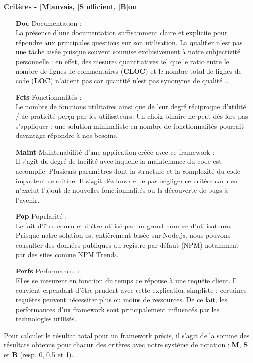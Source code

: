 \noindent\textbf{Critères - [M]auvais, [S]ufficient, [B]on}

\begin{itemize}
    \item[\textbf{Doc}] Documentation : \\
    La présence d'une documentation suffisamment claire et explicite pour répondre aux principales questions sur son utilisation.
    La qualifier n'est pas une tâche aisée puisque souvent soumise exclusivement à notre subjectivité personnelle : en effet, des mesures quantitatives tel que le ratio entre le nombre de lignes de commentaires (\textbf{CLOC}) et le nombre total de lignes de code (\textbf{LOC}) n'aident pas car quantité n'est pas synonyme de qualité .. 
    \item[\textbf{Fcts}] Fonctionnalités : \\
    Le nombre de fonctions utilitaires ainsi que de leur degré réciproque d'utilité / de praticité perçu par les utilisateurs. Un choix binaire ne peut dès lors pas s'appliquer : une solution minimaliste en nombre de fonctionnalités pourrait davantage répondre à nos besoins.
    \item[\textbf{Maint}] Maintenabilité d'une application créée avec ce framework : \\
    Il s'agit du degré de facilité avec laquelle la maintenance du code est accomplie. Plusieurs paramètres dont la structure et la complexité du code impactent ce critère. Il s'agit dès lors de ne pas négliger ce critère car rien n'exclut l'ajout de nouvelles fonctionnalités ou la découverte de bugs à l'avenir.
    \item[\textbf{Pop}] Popularité : \\
    Le fait d'être connu et d'être utilisé par un grand nombre d'utilisateurs.
    Puisque notre solution est entièrement basée sur Node.js, nous pouvons consulter des données publiques du registre par défaut (NPM) notamment par des sites comme \href{https://www.npmtrends.com/}{NPM Trends}.
    \item[\textbf{Perfs}] Performances : \\
    Elles se mesurent en fonction du temps de réponse à une requête client.
    Il convient cependant d'être prudent avec cette explication simpliste : certaines requêtes peuvent nécessiter plus ou moins de ressources.
    De ce fait, les performances d'un framework sont principalement influencés par les technologies utilisés. 
\end{itemize}

Pour calculer le résultat total pour un framework précis, il s'agit de la somme des résultats obtenus pour chacun des critères avec notre système de notation : \textbf{M}, \textbf{S} et \textbf{B} (resp. 0, 0.5 et 1).

